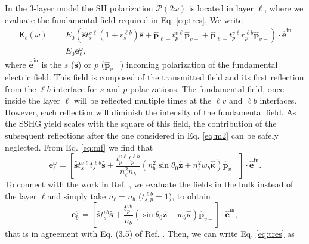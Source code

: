 In the 3-layer model the SH polarization $\boldsymbol{\mathcal{P}}(2\omega)$ is
located in layer $\ell$, where we evaluate the fundamental field required in Eq.
\eqref{eq:tres}. We write
\begin{equation}\label{eq:m2}
\begin{split}
\mathbf{E}_{\ell}(\omega) 
&= E_{0}
\left(
  \hat{\mathbf{s}} t^{v\ell}_{s}(1+r^{\ell b}_{s})\hat{\mathbf{s}}
+ \hat{\mathbf{p}}_{\ell-}t^{v\ell}_{p}\hat{\mathbf{p}}_{v-}
+ \hat{\mathbf{p}}_{\ell+}t^{v\ell}_{p}r^{\ell b}_{p}\hat{\mathbf{p}}_{v-}
\right)
\cdot\hat{\mathbf{e}}^{\mathrm{in}}\\
&= E_{0}\mathbf{e}^\omega_{\ell},
\end{split}
\end{equation} 
where $\hat{\mathbf{e}}^{\mathrm{in}}$ is the $s$ ($\hat{\mathbf{s}}$) or $p$
($\hat{\mathbf{p}}_{v-}$) incoming polarization of the fundamental electric
field. This field is composed of the transmitted field and its first reflection
from the $\ell b$ interface for $s$ and $p$ polarizations. The fundamental
field, once inside the layer $\ell$ will be reflected multiple times at the
$\ell v$ and $\ell b$ interfaces. However, each reflection will diminish the
intensity of the fundamental field. As the SSHG yield scales with the square of
this field, the contribution of the subsequent reflections after the one
considered in Eq. \eqref{eq:m2} can be safely neglected. From Eq. \eqref{eq:mf}
we find that
\begin{equation}\label{eq:m12}
\mathbf{e}^{\omega}_{\ell} =
\left[
  \hat{\mathbf{s}}t_{s}^{v\ell}t_{s}^{\ell b}\hat{\mathbf{s}} 
+ \frac{t^{v\ell}_{p}t^{\ell b}_{p}}{n^{2}_{\ell} n_{b}}
\left(
  n^{2}_{b}\sin\theta_{0}\hat{\mathbf{z}} 
+ n^{2}_{\ell} w_b\hat{\boldsymbol{\kappa}}
\right)
\hat{\mathbf{p}}_{v-}
\right]
\cdot\hat{\mathbf{e}}^{\mathrm{in}}.  
\end{equation}  
To connect with the work in Ref. \cite{mizrahiJOSA88}, we evaluate the fields in
the bulk instead of the layer $\ell$and simply take $n_{\ell} = n_{b}$
$(t^{\ell b}_{s,p} = 1$), to obtain
\begin{equation}\label{eq:m13}
\mathbf{e}^{\omega}_{b} =
\left[
  \hat{\mathbf{s}}t_{s}^{vb}\hat{\mathbf{s}}
+ \frac{t^{vb}_{p}}{n_{b}}
\left(\sin\theta_{0}\hat{\mathbf{z}} + w_b\hat{\boldsymbol{\kappa}}\right) 
\hat{\mathbf{p}}_{v-}
\right]
\cdot\hat{\mathbf{e}}^{\mathrm{in}},  
\end{equation} 
that is in agreement with Eq. (3.5) of Ref. \cite{mizrahiJOSA88}. Then, we can
write Eq. \eqref{eq:tres} as
